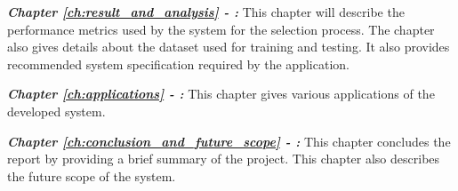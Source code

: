 \textbf{\textit{Chapter \ref{ch:result_and_analysis} - :}}
This chapter will describe the performance metrics used by the system for the selection
process. The chapter also gives details about the dataset used for training and testing. It
also provides recommended system specification required by the application.

\textbf{\textit{Chapter \ref{ch:applications} - :}}
This chapter gives various applications of the developed system.

\textbf{\textit{Chapter \ref{ch:conclusion_and_future_scope} - :}}
This chapter concludes the report by providing a brief summary of the project. This chapter
also describes the future scope of the system.
